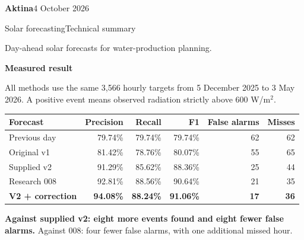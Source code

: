 \documentclass[10pt,a4paper]{article}
\newcommand{\labelhead}[1]{{\small\bfseries #1}\par\vspace{2pt}}
\begin{document}
{\fontsize{28}{30}\selectfont\bfseries Aktina}\hfill{\small 4 October 2026}\par
\vspace{2mm}
{\Large Solar forecasting}\hfill{\small\color{muted}Technical summary}\par
\vspace{2mm}
Day-ahead solar forecasts for water-production planning.
\vspace{2mm}


\vspace{2mm}
\labelhead{Measured result}
All methods use the same 3,566 hourly targets from 5 December 2025 to 3 May 2026. A positive event means observed radiation strictly above 600 W/m$^2$.

{\small
\begin{tabularx}{\linewidth}{@{}Xrrrrr@{}}
\toprule
Forecast & Precision & Recall & F1 & False alarms & Misses\\
\midrule
Previous day & 79.74\% & 79.74\% & 79.74\% & 62 & 62\\
Original v1 & 81.42\% & 78.76\% & 80.07\% & 55 & 65\\
Supplied v2 & 91.29\% & 85.62\% & 88.36\% & 25 & 44\\
Research 008 & 92.81\% & 88.56\% & 90.64\% & 21 & 35\\
\bfseries V2 + correction & \bfseries94.08\% & \bfseries88.24\% & \bfseries91.06\% & \bfseries17 & \bfseries36\\
\bottomrule
\end{tabularx}}

\textbf{Against supplied v2: eight more events found and eight fewer false alarms.} Against 008: four fewer false alarms, with one additional missed hour.
\end{document}
